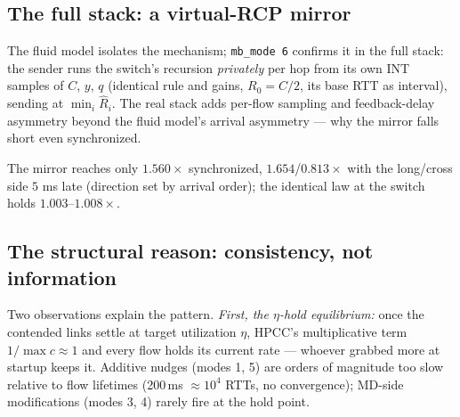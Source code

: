 \documentclass[sigconf, nonacm]{acmart}
\begin{document}
\subsection{The full stack: a virtual-RCP mirror}
\label{sec:vrcp}

The fluid model isolates the mechanism; \texttt{mb\_mode 6} confirms it in the full stack:
the sender runs the switch's recursion \emph{privately} per hop from its own INT samples of
$C$, $y$, $q$ (identical rule and gains, $R_0 = C/2$, its base RTT as interval), sending at
$\min_i \hat R_i$. The real stack adds per-flow sampling and feedback-delay asymmetry beyond
the fluid model's arrival asymmetry --- why the mirror falls short even synchronized.

The mirror reaches only $1.560\times$ synchronized, $1.654$/$0.813\times$ with the
long/cross side $5$ ms late (direction set by arrival order); the identical law at the switch
holds $1.003$--$1.008\times$.

\subsection{The structural reason: consistency, not information}

Two observations explain the pattern. \emph{First, the $\eta$-hold equilibrium:} once the
contended links settle at target utilization $\eta$, HPCC's multiplicative term
$1/\max c \approx 1$ and every flow holds its current rate --- whoever grabbed more at startup
keeps it. Additive nudges (modes 1, 5) are orders of magnitude too slow relative to flow lifetimes
(200\,ms ${\approx} 10^4$ RTTs, no convergence); MD-side modifications (modes 3, 4) rarely
fire at the hold point.
\end{document}
